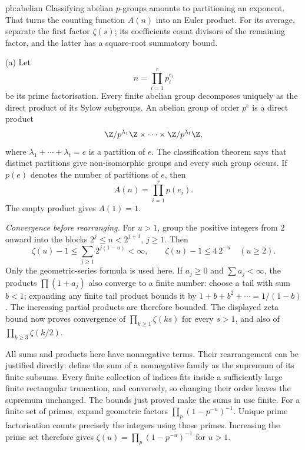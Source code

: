 \begin{solution}{pb:abelian}
\idea Classifying abelian $p$-groups amounts to partitioning an exponent. That turns the counting function $A(n)$ into an Euler product. For its average, separate the first factor $\zeta(s)$; its coefficients count divisors of the remaining factor, and the latter has a square-root summatory bound.

\writeup (a) Let
\[
n=\prod_{i=1}^r p_i^{e_i}
\]
be its prime factorisation. Every finite abelian group decomposes uniquely as the direct product of its Sylow subgroups. An abelian group of order $p^e$ is a direct product
\[
\Z/p^{\lambda_1}\Z\times\cdots\times\Z/p^{\lambda_t}\Z,
\]
where $\lambda_1+\cdots+\lambda_t=e$ is a partition of $e$. The classification theorem says that distinct partitions give non-isomorphic groups and every such group occurs. If $p(e)$ denotes the number of partitions of $e$, then
\[
\boxed{A(n)=\prod_{i=1}^rp(e_i)}.
\]
The empty product gives $A(1)=1$.

\emph{Convergence before rearranging.}
For $u>1$, group the positive integers from $2$ onward into the blocks
$2^j\le n<2^{j+1}$, $j\ge1$. Then
\[
\zeta(u)-1\le\sum_{j\ge1}2^{j(1-u)}<\infty,
\qquad \zeta(u)-1\le4\,2^{-u}\quad(u\ge2).
\]
Only the geometric-series formula is used here.
If $a_j\ge0$ and $\sum a_j<\infty$, the products $\prod(1+a_j)$ also
converge to a finite number: choose a tail with sum $b<1$; expanding any
finite tail product bounds it by $1+b+b^2+\cdots=1/(1-b)$.
The increasing partial products are therefore bounded.
The displayed zeta bound now proves convergence of $\prod_{k\ge1}\zeta(ks)$
for every $s>1$, and also of $\prod_{k\ge3}\zeta(k/2)$.

All sums and products here have nonnegative terms. Their rearrangement can
be justified directly: define the sum of a nonnegative family as the
supremum of its finite subsums. Every finite collection of indices fits
inside a sufficiently large finite rectangular truncation, and conversely,
so changing their order leaves the supremum unchanged. The bounds just
proved make the sums in use finite.
For a finite set of primes, expand geometric factors
$\prod_p(1-p^{-u})^{-1}$. Unique prime factorisation counts precisely the
integers using those primes. Increasing the prime set therefore gives
$\zeta(u)=\prod_p(1-p^{-u})^{-1}$ for $u>1$.


\end{solution}
